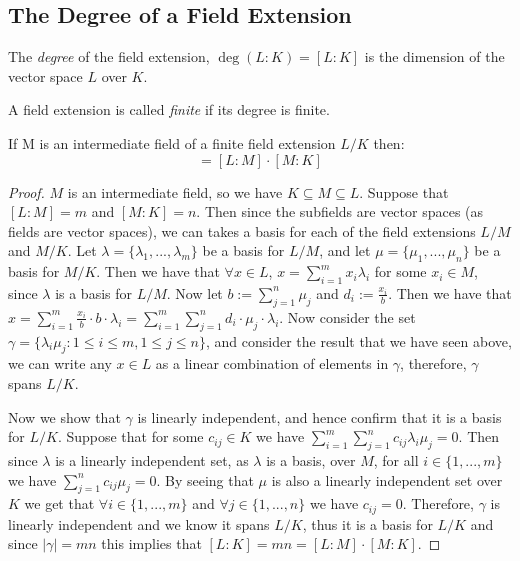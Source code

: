 \subsection{The Degree of a Field Extension}
\begin{definition}
    The \textit{degree} of the field extension, $\deg(L:K)=[L:K]$ is the dimension of the vector space $L$ over $K$.
\end{definition}
\begin{definition}
    A field extension is called \textit{finite} if its degree is finite. 
\end{definition}
\begin{theorem} \label{thm:tower-theorem}
    If M is an intermediate field of a finite field extension $L/K$ then:
\begin{equation*}
    [L:K] = [L:M]\cdot[M:K]
\end{equation*}
\end{theorem}
\begin{proof}
$M$ is an intermediate field, so we have $K \subseteq M \subseteq L$. Suppose that $[L:M]=m$ and $[M:K]=n$. Then since the subfields are vector spaces (as fields are vector spaces), we can takes a basis for each of the field extensions $L/M$ and $M/K$.
Let $\lambda = \{\lambda_1,...,\lambda_m\}$ be a basis for $L/M$, and let $\mu = \{\mu_1,...,\mu_n\}$ be a basis for $M/K$. Then we have that $\forall x \in L$, $x = \sum^m_{i=1}x_i\lambda_i$ for some $x_i \in M$, since $\lambda$ is a basis for $L/M$. Now let $b:=\sum^n_{j=1}\mu_j$ and $d_i:=\frac{x_i}{b}$. Then we have that $x=\sum^m_{i=1}\frac{x_i}{b}\cdot b \cdot \lambda_i = \sum^m_{i=1}\sum^n_{j=1}d_i\cdot \mu_j \cdot \lambda_i$. Now consider the set $\gamma=\{\lambda_i\mu_j : 1\leq i \leq m, 1\leq j \leq n\}$, and consider the result that we have seen above, we can write any $x \in L$ as a linear combination of elements in $\gamma$, therefore, $\gamma$ spans $L/K$.

Now we show that $\gamma$ is linearly independent, and hence confirm that it is a basis for $L/K$. Suppose that for some $c_{ij} \in K$ we have $\sum^m_{i=1} \sum^n_{j=1} c_{ij}\lambda_i\mu_j = 0 $. Then since $\lambda$ is a linearly independent set, as $\lambda$ is a basis, over $M$, for all $i \in \{1,...,m\}$ we have $\sum^n_{j=1} c_{ij}\mu_j = 0 $. By seeing that $\mu$ is also a linearly independent set over $K$ we get that $\forall i \in \{1,...,m\}$ and $\forall j \in \{1,...,n\}$ we have $c_{ij} = 0$. Therefore, $\gamma$ is linearly independent and we  know it spans $L/K$, thus it is a basis for $L/K$ and since $|\gamma|=mn$ this implies that $[L:K] = mn = [L:M]\cdot[M:K]$.

\end{proof}

